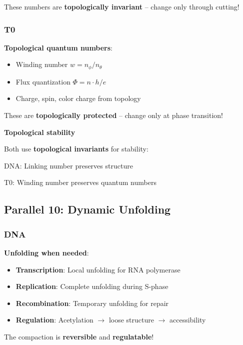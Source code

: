 	These numbers are \textbf{topologically invariant} -- change only through cutting!
	
	\subsubsection{T0}
	
	\textbf{Topological quantum numbers}:
	\begin{itemize}
		\item Winding number $w = n_\phi / n_\theta$
		\item Flux quantization $\Phi = n \cdot h/e$
		\item Charge, spin, color charge from topology
	\end{itemize}
	
	These are \textbf{topologically protected} -- change only at phase transition!
	
	\begin{keyresult}
		\textbf{Topological stability}
		
		Both use \textbf{topological invariants} for stability:
		
		DNA: Linking number preserves structure
		
		T0: Winding number preserves quantum numbers
	\end{keyresult}
	
	\subsection{Parallel 10: Dynamic Unfolding}
	
	\subsubsection{DNA}
	
	\textbf{Unfolding when needed}:
	
	\begin{itemize}
		\item \textbf{Transcription}: Local unfolding for RNA polymerase
		\item \textbf{Replication}: Complete unfolding during S-phase
		\item \textbf{Recombination}: Temporary unfolding for repair
		\item \textbf{Regulation}: Acetylation $\to$ loose structure $\to$ accessibility
	\end{itemize}
	
	The compaction is \textbf{reversible} and \textbf{regulatable}!
	
